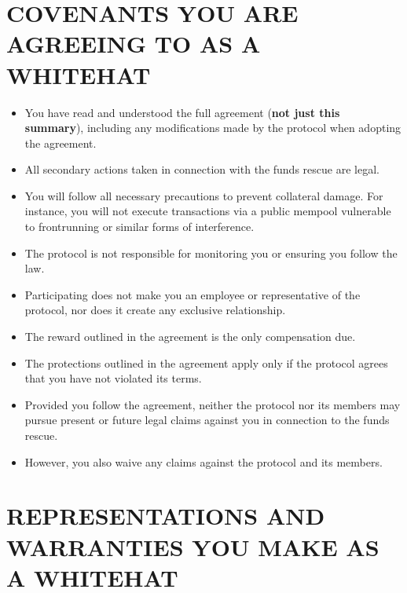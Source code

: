 \documentclass{article}
\begin{document}
\section{COVENANTS YOU ARE AGREEING TO AS A WHITEHAT}

\begin{itemize}
    \item You have read and understood the full agreement (\textbf{not just this summary}), including any modifications made by the protocol when adopting the agreement.
    \item All secondary actions taken in connection with the funds rescue are legal.
    \item You will follow all necessary precautions to prevent collateral damage. For instance, you will not execute transactions via a public mempool vulnerable to frontrunning or similar forms of interference.
    \item The protocol is not responsible for monitoring you or ensuring you follow the law.
    \item Participating does not make you an employee or representative of the protocol, nor does it create any exclusive relationship.
    \item The reward outlined in the agreement is the only compensation due.
    \item The protections outlined in the agreement apply only if the protocol agrees that you have not violated its terms.
    \item Provided you follow the agreement, neither the protocol nor its members may pursue present or future legal claims against you in connection to the funds rescue.
    \item However, you also waive any claims against the protocol and its members.
\end{itemize}

\section{REPRESENTATIONS AND WARRANTIES YOU MAKE AS A WHITEHAT}
\end{document}

